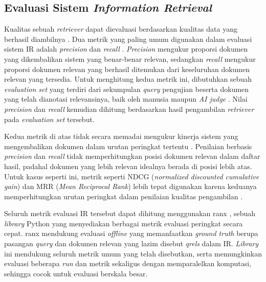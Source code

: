 \subsection{Evaluasi Sistem \textit{Information Retrieval}}

Kualitas sebuah \textit{retriever} dapat dievaluasi berdasarkan kualitas data yang berhasil diambilnya \parencite{huyenAIEngineeringBuilding2025}. Dua metrik yang paling umum digunakan dalam evaluasi sistem IR adalah \textit{precision} dan \textit{recall} \parencite{jm3}. \textit{Precision} mengukur proporsi dokumen yang dikembalikan sistem yang benar-benar relevan, sedangkan \textit{recall} mengukur proporsi dokumen relevan yang berhasil ditemukan dari keseluruhan dokumen relevan yang tersedia. Untuk menghitung kedua metrik ini, dibutuhkan sebuah \textit{evaluation set} yang terdiri dari sekumpulan \textit{query} pengujian beserta dokumen yang telah dianotasi relevansinya, baik oleh manusia maupun \textit{AI judge} \parencite{huyenAIEngineeringBuilding2025}. Nilai \textit{precision} dan \textit{recall} kemudian dihitung berdasarkan hasil pengambilan \textit{retriever} pada \textit{evaluation set} tersebut.

Kedua metrik di atas tidak secara memadai mengukur kinerja sistem yang mengembalikan dokumen dalam urutan peringkat tertentu \parencite{jm3}. Penilaian berbasis \textit{precision} dan \textit{recall} tidak memperhitungkan posisi dokumen relevan dalam daftar hasil, padahal dokumen yang lebih relevan idealnya berada di posisi lebih atas. Untuk kasus seperti ini, metrik seperti NDCG (\textit{normalized discounted cumulative gain}) dan MRR (\textit{Mean Reciprocal Rank}) lebih tepat digunakan karena keduanya memperhitungkan urutan peringkat dalam penilaian kualitas pengambilan \parencite{huyenAIEngineeringBuilding2025}.

Seluruh metrik evaluasi IR tersebut dapat dihitung menggunakan ranx \parencite{bassaniRanxBlazingFastPython2022}, sebuah \textit{library} Python yang menyediakan berbagai metrik evaluasi peringkat secara cepat. ranx mendukung evaluasi \textit{offline} yang memanfaatkan \textit{ground truth} berupa pasangan \textit{query} dan dokumen relevan yang lazim disebut \textit{qrels} dalam IR. \textit{Library} ini mendukung seluruh metrik umum yang telah disebutkan, serta memungkinkan evaluasi beberapa \textit{run} dan metrik sekaligus dengan memparalelkan komputasi, sehingga cocok untuk evaluasi berskala besar.

